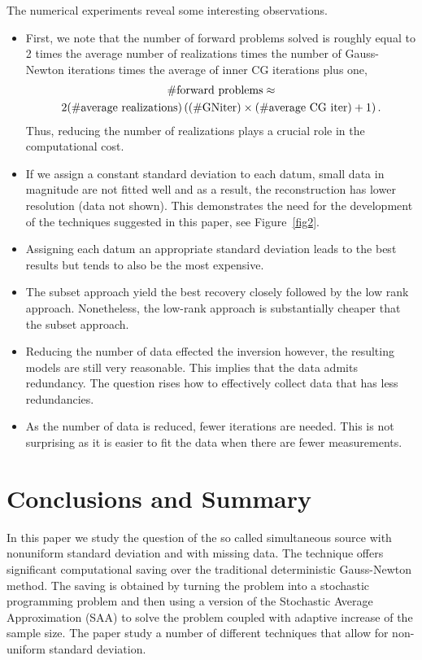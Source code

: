 \documentclass[12pt]{article}
\begin{document}
The numerical experiments reveal some interesting observations.
\begin{itemize}
\item First, we note that the number of forward problems solved is roughly equal to 2 times the average number of realizations times the number of Gauss-Newton iterations times the average of inner CG iterations plus one,
\begin{multline*}
	\# {\rm forward\ problems} \approx \\ 2 (\# {\rm average\ realizations})
\left( (\# {\rm GN iter}) \times (\# {\rm average\ CG\ iter}) + 1\right).
\end{multline*}
Thus, reducing the number of realizations plays a crucial role in the computational cost.
\item If we assign a constant standard deviation to each datum, small  data in magnitude are not fitted well and as a result, the reconstruction has lower resolution (data not shown). This demonstrates the need for the development of the techniques suggested in this paper, see Figure~\ref{fig2}.
\item
Assigning each datum an appropriate standard deviation leads to the best results but tends
to also be the most expensive.
\item The  subset approach    yield the best recovery closely followed by the  low rank approach.
Nonetheless, the low-rank approach is substantially cheaper that the subset approach.
\item Reducing the number of data  effected the inversion however, the resulting models are
still very reasonable. This implies that the data admits redundancy. The question rises how to effectively
collect data that has less redundancies.
\item As the number of data is reduced, fewer iterations are needed. This is not surprising as it is
easier to fit the data when there are fewer measurements.
\end{itemize}


\section{Conclusions and Summary}
\label{sec5}

 In this paper we study the question of the so called simultaneous source with nonuniform standard deviation
 and with missing data. The technique offers significant computational saving over the traditional
 deterministic Gauss-Newton method. The saving is obtained by turning the problem into a stochastic
programming problem and then using a version of the Stochastic Average Approximation (SAA) to solve
the problem coupled with adaptive increase of the sample size. The paper study a number of different
techniques that allow for non-uniform standard deviation.
\end{document}
